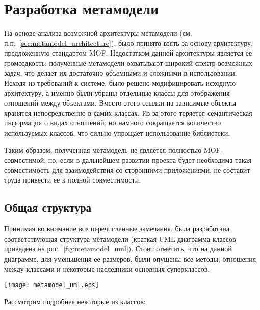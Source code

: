 \section{Разработка метамодели}

На основе анализа возможной архитектуры метамодели (см.
п.п.~\ref{sec:metamodel_architecture}), было принято взять за основу
архитектуру, предложенную стандартом MOF. Недостатком данной архитектуры
является ее громоздкость: полученные метамодели охватывают широкий спектр
возможных задач, что делает их достаточно объемными и сложными в использовании.
Исходя из требований к системе, было решено модифицировать исходную архитектуру,
а именно были убраны отдельные классы для отображения отношений между объектами.
Вместо этого ссылки на зависимые объекты хранятся непосредственно в самих
классах. Из-за этого теряется семантическая информация о видах отношений, но
намного сокращается количество используемых классов, что сильно упрощает
использование библиотеки.

Таким образом, полученная метамодель не является полностью MOF-совместимой, но,
если в дальнейшем развитии проекта будет необходима такая совместимость для
взаимодействия со сторонними приложениями, не составит труда привести ее к
полной совместимости.

\subsection{Общая структура}

Принимая во внимание все перечисленные замечания, была разработана
соответствующая структура метамодели (краткая UML-диаграмма классов приведена на
рис.~\ref{fig:metamodel_uml}). Стоит отметить, что на данной диаграмме, для
уменьшения ее размеров, были опущены все методы, отношения между классами и
некоторые наследники основных суперклассов.

\begin{sidewaysfigure}[!htbp]
    \begin{center}
        \texttt{[image: metamodel\_uml.eps]}
    \end{center}
    \caption{Упрощенная диаграмма классов метамодели}
    \label{fig:metamodel_uml}
\end{sidewaysfigure}

\newpage
Рассмотрим подробнее некоторые из классов:

